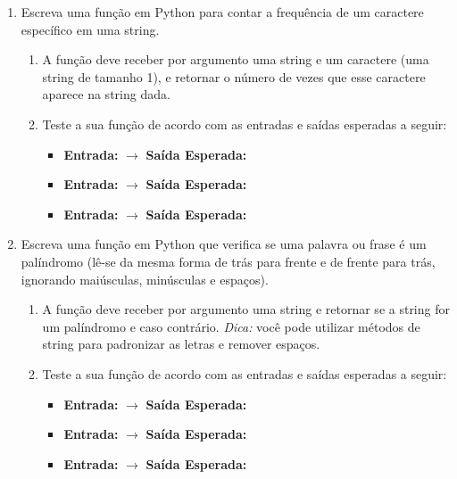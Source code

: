 \begin{enumerate}[label=\textbf{Q\arabic*.}]
    \item Escreva uma função em Python para contar a frequência de um caractere específico em uma string.
    \begin{enumerate}[label=\alph*)]
        \item A função deve receber por argumento uma string e um caractere (uma string de tamanho 1), e retornar o número de vezes que esse caractere aparece na string dada.
        \item Teste a sua função de acordo com as entradas e saídas esperadas a seguir:
        \begin{itemize}
            \item \textbf{Entrada:}  $\rightarrow$ \textbf{Saída Esperada:} 
            \item \textbf{Entrada:}  $\rightarrow$ \textbf{Saída Esperada:} 
            \item \textbf{Entrada:}  $\rightarrow$ \textbf{Saída Esperada:} 
        \end{itemize}
    \end{enumerate}

    \vspace{0.5cm}
    

    \item Escreva uma função em Python que verifica se uma palavra ou frase é um palíndromo (lê-se da mesma forma de trás para frente e de frente para trás, ignorando maiúsculas, minúsculas e espaços).
    \begin{enumerate}[label=\alph*)]
        \item A função deve receber por argumento uma string e retornar  se a string for um palíndromo e  caso contrário. \textit{Dica:} você pode utilizar métodos de string para padronizar as letras e remover espaços.
        \item Teste a sua função de acordo com as entradas e saídas esperadas a seguir:
        \begin{itemize}
            \item \textbf{Entrada:}  $\rightarrow$ \textbf{Saída Esperada:} 
            \item \textbf{Entrada:}  $\rightarrow$ \textbf{Saída Esperada:} 
            \item \textbf{Entrada:}  $\rightarrow$ \textbf{Saída Esperada:} 
        \end{itemize}
    \end{enumerate}
    


\end{enumerate}
